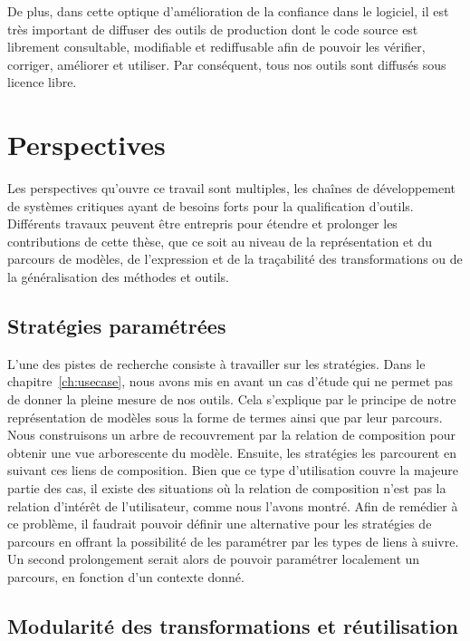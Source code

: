 De plus, dans cette optique d'amélioration de la confiance dans le logiciel, il
est très important de diffuser des outils de production dont le code source est
librement consultable, modifiable et rediffusable afin de pouvoir les vérifier,
corriger, améliorer et utiliser.
Par conséquent, tous nos outils sont diffusés sous licence libre. %


\section*{Perspectives}

Les perspectives qu'ouvre ce travail sont multiples, les chaînes de
développement de systèmes critiques ayant de besoins forts pour la
qualification d'outils. Différents travaux peuvent être entrepris pour
étendre et prolonger les contributions de cette thèse, que ce soit au niveau de
la représentation et du parcours de modèles, de l'expression et de la
traçabilité des transformations ou de la généralisation des méthodes et outils.

\subsection*{Stratégies paramétrées}

L'une des pistes de recherche consiste à travailler sur les stratégies. Dans le
chapitre~\ref{ch:usecase}, nous avons mis en avant un cas d'étude qui ne permet
pas de donner la pleine mesure de nos outils. Cela s'explique par le principe
de notre représentation de modèles sous la forme de termes ainsi que par leur
parcours. Nous construisons un arbre de recouvrement par la relation de
composition pour obtenir une vue arborescente du modèle. Ensuite, les
stratégies les parcourent en suivant ces liens de composition. Bien que ce type
d'utilisation couvre la majeure partie des cas, il existe des situations où la
relation de composition n'est pas la relation d'intérêt de l'utilisateur, comme
nous l'avons montré. Afin de remédier à ce problème, il faudrait pouvoir
définir une alternative pour les stratégies de parcours en offrant la
possibilité de les paramétrer par les types de liens à suivre. Un second
prolongement serait alors de pouvoir paramétrer localement un parcours, en
fonction d'un contexte donné.

\subsection*{Modularité des transformations et réutilisation}

